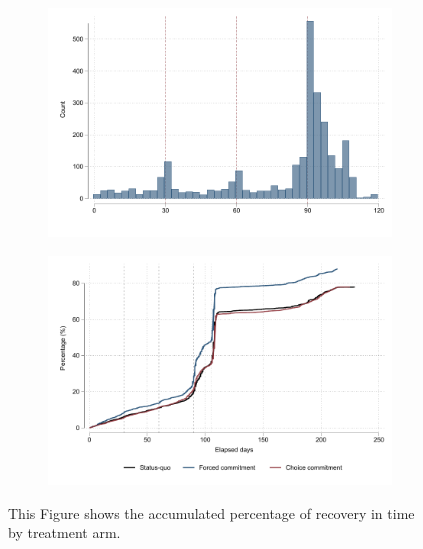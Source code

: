 \documentclass[oneside,11pt]{article}
\begin{document}
\begin{figure}[H]
\begin{center}
\begin{subfigure}{0.31\textwidth}
        \includegraphics[width=\textwidth]{Figuras/hist_payments_cc.pdf}
    \end{subfigure}    
    \end{center}
     \scriptsize
\end{figure}


\begin{figure}[H]
        \caption{Survival graph}
    \label{survival_graph}
    \begin{center}
   \begin{subfigure}{0.49\textwidth}
        \centering
        \includegraphics[width=\textwidth]{Figuras/survival_graph_ended.pdf}
    \end{subfigure} 
    \end{center}
     \scriptsize  This Figure shows the accumulated percentage of recovery in time by treatment arm. 
\end{figure}
\end{document}
